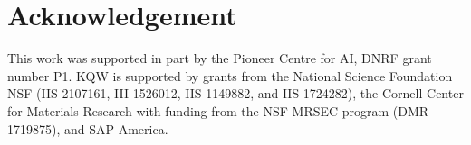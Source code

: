 \section*{Acknowledgement}
\label{sec:acknowledgement}

This work was supported in part by the Pioneer Centre for AI, DNRF grant number P1. KQW is supported by grants from the National Science Foundation NSF (IIS-2107161, III-1526012, IIS-1149882, and IIS-1724282), the Cornell Center for Materials Research with funding from the NSF MRSEC program (DMR-1719875), and SAP America.